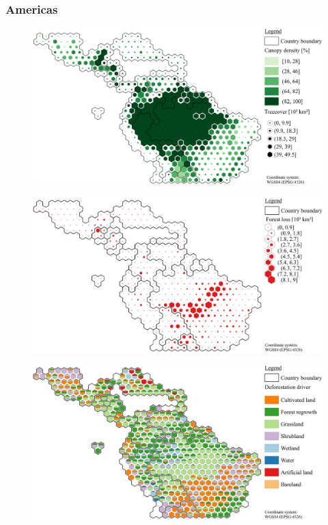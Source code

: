 		\subsubsection{Americas}
			\begin{figure}[ht]
				\centering
				\includegraphics[scale=1]{img/americas_treecover_frameless}
				\caption[Ecosystem service values]{}
				\label{fig:americascover}
			\end{figure}
			\begin{figure}[ht]
				\centering
				\includegraphics[scale=1]{img/americas_loss_frameless}
				\caption[Ecosystem service values]{}
				\label{fig:americasloss}
			\end{figure}
			\begin{figure}[ht]
				\centering
				\includegraphics[scale=1]{img/americas_driver_frameless}
				\caption[Ecosystem service values]{}
				\label{fig:americasdriver}
			\end{figure}

